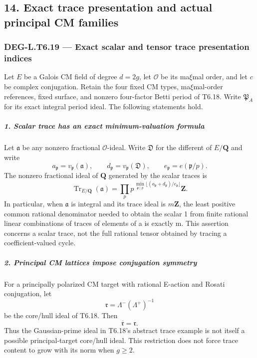 \subsection{14. Exact trace presentation and actual principal CM families}\label{exact-trace-presentation-and-actual-principal-cm-families}

\subsubsection{DEG-L.T6.19 --- Exact scalar and tensor trace presentation indices}\label{DEG-L.T6.19}

Let \(E\) be a Galois CM field of degree \(d=2g\), let \(\mathcal O\) be its ma\(\xi\)mal order, and let \(c\) be complex conjugation. Retain the four fixed CM types, ma\(\xi\)mal-order references, fixed surface, and nonzero four-factor Betti period of T6.18. Write \(\mathfrak P_A\) for its exact integral period ideal. The following statements hold.

\subparagraph{1. Scalar trace has an exact minimum-valuation formula}\label{scalar-trace-has-an-exact-minimum-valuation-formula}

Let \(\mathfrak a\) be any nonzero fractional \(\mathcal O\)-ideal. Write \(\mathfrak D\) for the different of \(E/\mathbf Q\) and write \[
 a_{\mathfrak p}=v_{\mathfrak p}(\mathfrak a),\qquad
 d_{\mathfrak p}=v_{\mathfrak p}(\mathfrak D),\qquad
 e_{\mathfrak p}=e(\mathfrak p/p).
\] The nonzero fractional ideal of \(\mathbf Q\) generated by the scalar traces is \[
 \operatorname{Tr}_{E/\mathbf Q}(\mathfrak a)
 =\prod_p p^{\,\min_{\mathfrak p\mid p}
       \lfloor(a_{\mathfrak p}+d_{\mathfrak p})/e_{\mathfrak p}\rfloor}\mathbf Z.
 \tag{T19.1}
\] In particular, when \(\mathfrak a\) is integral and its trace ideal is \(m\mathbf Z\), the least positive common rational denominator needed to obtain the scalar 1 from finite rational linear combinations of traces of elements of a is exactly m. This assertion concerns a scalar trace, not the full rational tensor obtained by tracing a coefficient-valued cycle.

\subparagraph{2. Principal CM lattices impose conjugation symmetry}\label{principal-cm-lattices-impose-conjugation-symmetry}

For a principally polarized CM target with rational E-action and Rosati conjugation, let \[
 \mathfrak r=\Lambda^-(\Lambda^+)^{-1}
\] be the core/hull ideal of T6.18. Then \[
 \overline{\mathfrak r}=\mathfrak r.
 \tag{T19.2}
\] Thus the Gaussian-prime ideal in T6.18's abstract trace example is not itself a possible principal-target core/hull ideal. This restriction does not force trace content to grow with its norm when \(g\ge2\).

